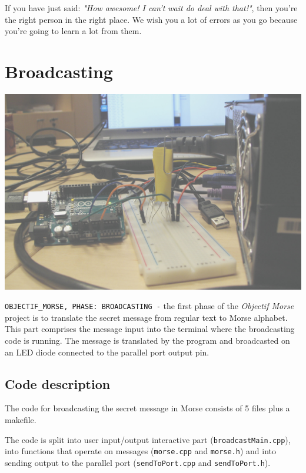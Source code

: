 \documentclass[12pt]{report}
\begin{document}
If you have just said: \textit{"How awesome! I can't wait do deal with that!"}, then you're the right person in the right place. We wish you a lot of errors as you go because you're going to learn a lot from them. 

\newpage

\chapter{Broadcasting}

\includegraphics[width = 145mm]{working_2.jpg}

\verb|OBJECTIF_MORSE, PHASE: BROADCASTING -| the first phase of the \textit{Objectif Morse} project is to translate the secret message from regular text to Morse alphabet. This part comprises the message input into the terminal where the broadcasting code is running. The message is translated by the program and broadcasted on an LED diode connected to the parallel port output pin.



\newpage

\section{Code description}

The code for broadcasting the secret message in Morse consists of 5 files plus a makefile.

The code is split into user input/output interactive part (\verb|broadcastMain.cpp|), into functions that operate on messages (\verb|morse.cpp| and \verb|morse.h|) and into sending output to the parallel port (\verb|sendToPort.cpp| and \verb|sendToPort.h|).
\end{document}
